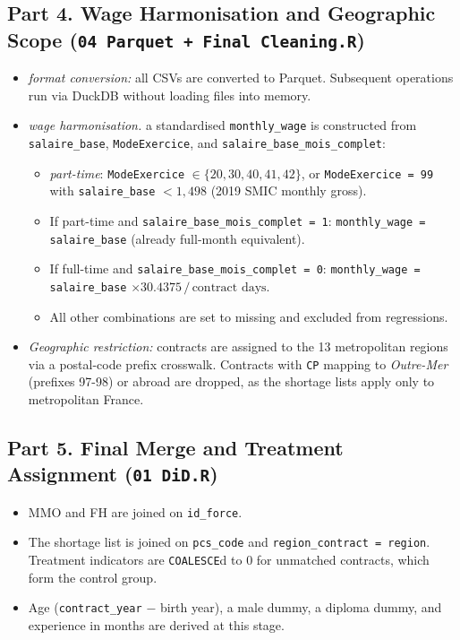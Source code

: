 \documentclass[10pt, a4paper]{article}
\begin{document}
\subsection*{Part 4. Wage Harmonisation and Geographic Scope
\textnormal{\small(\texttt{04 Parquet + Final Cleaning.R})}}
\smallskip
\begin{itemize}
  \item \textit{format conversion:} all CSVs are converted to Parquet.
  Subsequent operations run via DuckDB without loading files into memory.
  \smallskip
  \item \textit{wage harmonisation.} a standardised \texttt{monthly\_wage}
  is constructed from \texttt{salaire\_base}, \texttt{ModeExercice}, and
  \texttt{salaire\_base\_mois\_complet}:
  \begin{itemize}
    \item \textit{part-time}: \texttt{ModeExercice} $\in \{20,30,40,41,42\}$,
    or \texttt{ModeExercice = 99} with \texttt{salaire\_base} $< 1{,}498$
    (2019 SMIC monthly gross).
    \item If part-time and \texttt{salaire\_base\_mois\_complet = 1}:
    \texttt{monthly\_wage = salaire\_base} (already full-month equivalent).
    \item If full-time and \texttt{salaire\_base\_mois\_complet = 0}:
    \texttt{monthly\_wage = salaire\_base} $\times 30.4375\,/\,\text{contract days}$.
    \item All other combinations are set to missing and excluded from regressions.
  \end{itemize}
  \smallskip
  \item \textit{Geographic restriction:} contracts are assigned to the
  13 metropolitan regions via a postal-code prefix crosswalk. Contracts
  with \texttt{CP} mapping to \textit{Outre-Mer} (prefixes 97-98) or
  abroad are dropped, as the shortage lists apply only to metropolitan France.
\end{itemize}
\bigskip

\subsection*{Part 5. Final Merge and Treatment Assignment
\textnormal{\small(\texttt{01 DiD.R})}}
\smallskip
\begin{itemize}
  \item MMO and FH are joined on \texttt{id\_force}. 
\smallskip
  \item The shortage list is joined on \texttt{pcs\_code} and
  \texttt{region\_contract = region}. Treatment indicators
  are \texttt{COALESCE}d to 0 for unmatched contracts, which form
  the control group.
  \item Age (\texttt{contract\_year} $-$ birth year), a male dummy,
  a diploma dummy, and experience in months are derived at this stage.
\end{itemize}
\end{document}
